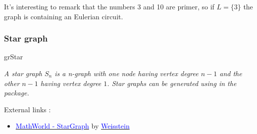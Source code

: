It's interesting to remark that the numbers 3 and 10 are primer, so if $L=\{3\} $ the graph is containing an Eulerian circuit.
 

\subsubsection{}
\begin{center}
\begin{tkzexample}[vbox]
\end{tkzexample}
\end{center}

\vfill\newpage\null 
{}
\SetVertexMath

\subsubsection{}

\SetVertexNoLabel
{}

\newpage 
\subsubsection{Star graph}  

\begin{NewMacroBox}{grStar}{}

\medskip
\emph{A star graph $S_n$ is a n-graph   with one node having vertex degree $n-1$  and the other $n-1$   having vertex degree $1$. Star graphs can be generated using  in   the  package.}

\medskip
External links :

\medskip
\begin{itemize}
\item \href{http://mathworld.wolfram.com/StarGraph.html}%
           {\textcolor{blue}{MathWorld - StarGraph}} by %
      \href{http://en.wikipedia.org/wiki/Eric_W._Weisstein}%
           {\textcolor{blue}{Weisstein}}
\end{itemize}
\end{NewMacroBox}

